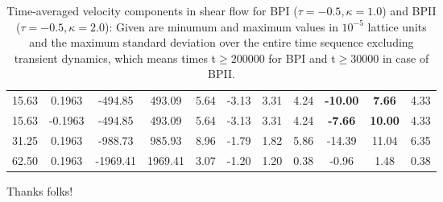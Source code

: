 \documentclass[aps,pre,reprint,superscriptaddress]{revtex4}
\begin{document}
\begin{table}
\begin{tabular}{|c|| c || c |c |c||c| c| c||c| c| c|}
15.63 &0.1963 &-494.85 &493.09 & 5.64 &-3.13 &3.31 &4.24 &\bf{-10.00} & \bf{7.66} &4.33\\
15.63 &-0.1963&-494.85 &493.09 & 5.64 & -3.13 &3.31 &4.24 &\bf{-7.66} & \bf{10.00} &4.33\\
31.25 &0.1963 &-988.73 &985.93 &8.96  &-1.79 &1.82 &5.86 &-14.39 & 11.04 &6.35\\
62.50 &0.1963 & -1969.41  & 1969.41 & 3.07 & -1.20 & 1.20 & 0.38 &-0.96 & 1.48 &0.38 \\
\hline
\end{tabular}
\caption{Time-averaged velocity components in shear flow for BPI ($\tau=-0.5, \kappa=1.0$) and BPII ($\tau=-0.5, \kappa=2.0$): Given are minumum and maximum values in $10^{-5}$ lattice units and the maximum standard deviation over the entire time sequence excluding transient dynamics, which means times t$\ge 200000$ for BPI and t$\ge 30000$ in case of BPII.
\label{tab1}}
\end{table}

\begin{acknowledgments}
Thanks folks!
\end{acknowledgments}


\end{document}
